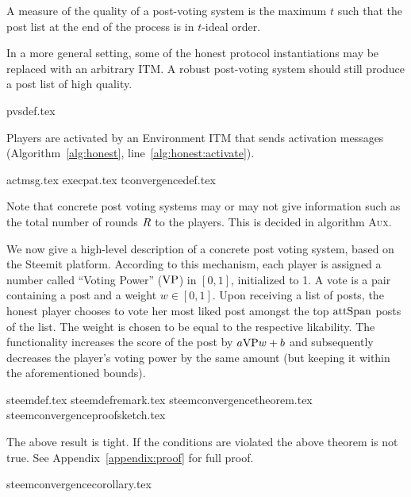    A measure of the quality of a post-voting system is the maximum $t$ such
    that the post list at the end of the process is in $t$-ideal order.

    In a more general setting, some of the honest protocol instantiations may be
    replaced with an arbitrary ITM. A robust post-voting system should still
    produce a post list of high quality.

    {pvsdef.tex}

    \noindent Players are activated by an Environment ITM that sends activation
    messages (Algorithm~\ref{alg:honest}, line~\ref{alg:honest:activate}).

    {actmsg.tex}
    {execpat.tex}
    {tconvergencedef.tex}

    \noindent Note that concrete post voting systems may or may not give
    information such as the total number of rounds $R$ to the players.
    This is decided in algorithm \textsc{Aux}.

    We now give a high-level description of a concrete post voting system, based
    on the Steemit platform. According to this mechanism, each player is
    assigned a number called ``Voting Power'' ($\mathrm{VP}$) in $\left[0,
    1\right]$, initialized to 1. A vote is a pair containing a post and a weight
    $w \in \left[0, 1\right]$. Upon receiving a list of posts, the honest player
    chooses to vote her most liked post amongst the top $\mathrm{attSpan}$ posts of the
    list. The weight is chosen to be equal to the respective likability. The
    functionality increases the score of the post by $a \mathrm{VP} w + b$ and
    subsequently decreases the player's voting power by the same amount (but
    keeping it within the aforementioned bounds).

    {steemdef.tex}
    {steemdefremark.tex}
    {steemconvergencetheorem.tex}
    {steemconvergenceproofsketch.tex}

    The above result is tight. If the conditions are violated the above theorem
    is not true.  See Appendix~\ref{appendix:proof} for full proof.

    {steemconvergencecorollary.tex}

